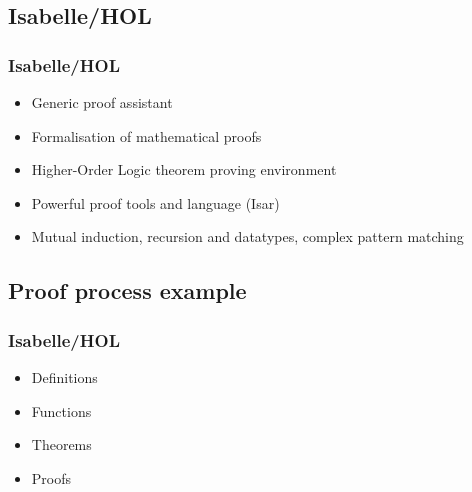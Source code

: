 \documentclass{beamer}
\theoremstyle{definition}
\begin{document}
\subsection{Isabelle/HOL}
\begin{frame}
  \frametitle{Isabelle/HOL}
  \begin{itemize}
    \item Generic proof assistant
    \vfill
    \item Formalisation of mathematical proofs
    \vfill
    \item Higher-Order Logic theorem proving environment
    \vfill
    \item Powerful proof tools and language (Isar) %
    \vfill
    \item Mutual induction, recursion and datatypes, complex pattern matching
  \end{itemize}
\end{frame}

\subsection{Proof process example}

\begin{frame}
  \frametitle{Isabelle/HOL}
  \centering
  \vfill
  \begin{itemize}
    \item<3-> Definitions
    \item<4-> Functions
    \item<5-> Theorems
    \item<6-> Proofs
  \end{itemize}
\end{frame}
\end{document}
